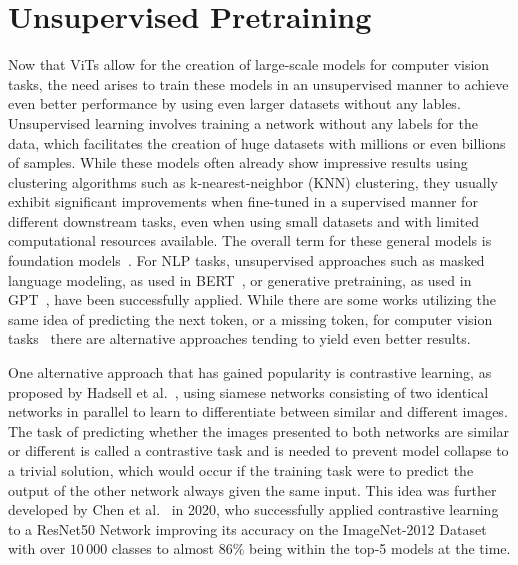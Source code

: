 \section{Unsupervised Pretraining}\label{sec:unsupervised-pretraining}
Now that ViTs allow for the creation of large-scale models for computer vision tasks, the need arises to train these models in an unsupervised manner to achieve even better performance by using even larger datasets without any lables.
Unsupervised learning involves training a network without any labels for the data, which facilitates the creation of huge datasets with millions or even billions of samples.
While these models often already show impressive results using clustering algorithms such as k-nearest-neighbor (KNN) clustering, they usually exhibit significant improvements when fine-tuned in a supervised manner for different downstream tasks, even when using small datasets and with limited computational resources available.
The overall term for these general models is foundation models~\cite{Bommasani2021}.
For NLP tasks, unsupervised approaches such as masked language modeling, as used in BERT~\cite{Devlin2018}, or generative pretraining, as used in GPT~\cite{Radford2018}, have been successfully applied.
While there are some works utilizing the same idea of predicting the next token, or a missing token, for computer vision tasks~\cite{Wei2022, Bao2021} there are alternative approaches tending to yield even better results.


One alternative approach that has gained popularity is contrastive learning, as proposed by Hadsell et al.~\cite{Hadsell2006}, using siamese networks consisting of two identical networks in parallel to learn to differentiate between similar and different images.
The task of predicting whether the images presented to both networks are similar or different is called a contrastive task and is needed to prevent model collapse to a trivial solution, which would occur if the training task were to predict the output of the other network always given the same input.
This idea was further developed by Chen et al.~\cite{Chen2020} in 2020, who successfully applied contrastive learning to a ResNet50 Network improving its accuracy on the ImageNet-2012 Dataset with over $10\,000$ classes to almost $86\%$ being within the top-5 models at the time.

